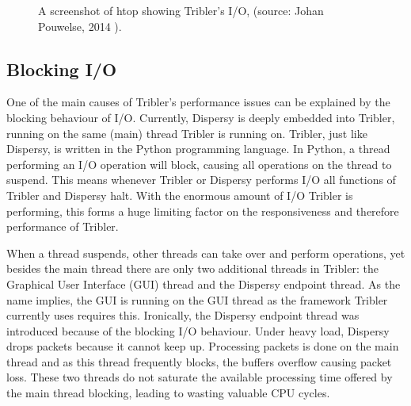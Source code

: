 \begin{figure}[!h]
	\caption{A screenshot of htop showing Tribler's I/O, (source: Johan Pouwelse, 2014 \cite{pouwelse2014reduce}).}
	\label{fig:iotop_tribler_april_2014}
\end{figure}

\subsection{Blocking I/O}
One of the main causes of Tribler's performance issues can be explained by the blocking behaviour of I/O.
Currently, Dispersy is deeply embedded into Tribler, running on the same (main) thread Tribler is running on.
Tribler, just like Dispersy, is written in the Python programming language.
In Python, a thread performing an I/O operation will block, causing all operations on the thread to suspend.
This means whenever Tribler or Dispersy performs I/O all functions of Tribler and Dispersy halt.
With the enormous amount of I/O Tribler is performing, this forms a huge limiting factor on the responsiveness and therefore performance of Tribler.

When a thread suspends, other threads can take over and perform operations, yet besides the main thread there are only two additional threads in Tribler: the Graphical User Interface (GUI) thread and the Dispersy endpoint thread.
As the name implies, the GUI is running on the GUI thread as the framework Tribler currently uses requires this.
Ironically, the Dispersy endpoint thread was introduced because of the blocking I/O behaviour.
Under heavy load, Dispersy drops packets because it cannot keep up.
Processing packets is done on the main thread and as this thread frequently blocks, the buffers overflow causing packet loss.
These two threads do not saturate the available processing time offered by the main thread blocking, leading to wasting valuable CPU cycles.

